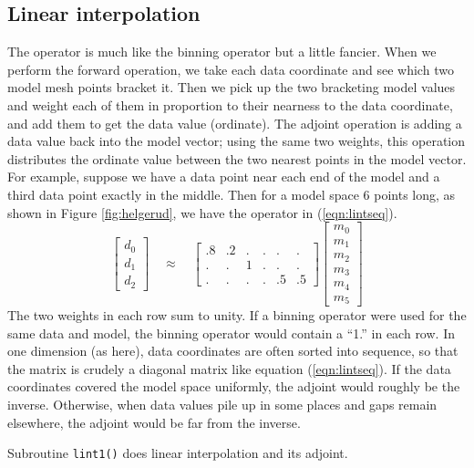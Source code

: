 \subsection{Linear interpolation}
\par
The 
operator is much like the binning operator but a little fancier.
When we perform the forward operation, we take each data coordinate
and see which two model mesh points bracket it.
Then we pick up the two bracketing model values
and weight each of them
in proportion to their nearness to the data coordinate,
and add them to get the data value (ordinate).
The adjoint operation is adding a data value
back into the model vector;
using the same two weights,
this operation distributes the ordinate value
between the two nearest points in the model vector.
For example, suppose we have a data point near each end of the model
and a third data point exactly in the middle.
Then for a model space 6 points long,
as shown in Figure \ref{fig:helgerud},
we have the operator in (\ref{eqn:lintseq}).
\begin{equation}
\left[ 
\begin{array}{c}
  d_0 \\ 
  d_1 \\ 
  d_2 
  \end{array} \right] 
\quad \approx \quad
\left[ 
\begin{array}{rrrrrr}
   .8 & .2 &  .  & .  & .  & .  \\
   .  & .  &  1  & .  & .  & .  \\
   .  & .  &  .  & .  & .5 & .5 
  \end{array} \right] 
\left[ 
	\begin{array}{c}
	  m_0 \\ 
	  m_1 \\ 
	  m_2 \\ 
	  m_3 \\ 
	  m_4 \\ 
	  m_5
	\end{array}
\right] 
\label{eqn:lintseq}
\end{equation}
The two weights in each row sum to unity.
If a binning operator were used for the same data and model,
the binning operator would contain a ``1.'' in each row.
In one dimension (as here),
data coordinates are often sorted into sequence,
so that the matrix is crudely a diagonal matrix like equation (\ref{eqn:lintseq}).
If the data coordinates covered the model space uniformly,
the adjoint would roughly be the inverse.
Otherwise,
when data values pile up in some places and gaps remain elsewhere,
the adjoint would be far from the inverse.
\par
Subroutine \texttt{lint1()} does linear interpolation and its adjoint.


